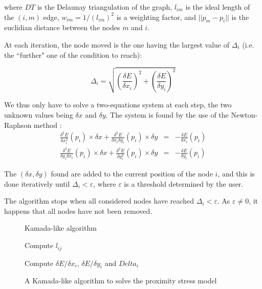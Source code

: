 \documentclass[12pt]{report}
\begin{document}
where $DT$ is the Delaunay triangulation of the graph, $l_{im}$ is the ideal length of the $(i,m)$ edge, $w_{im} = 1/(l_{im})^2 $ is a weighting factor, and $||p_m - p_i||$ is the euclidian distance between the nodes $m$ and $i$.

At each iteration, the node moved is the one having the largest value of $\Delta_i$ (i.e. the ``further" one of the condition to reach):

\[\Delta_i = \sqrt{\left(\frac{\delta E}{\delta x_i}\right)^2 + \left(\frac{\delta E}{\delta y_i}\right)^2} \]

\bigskip
We thus only have to solve a two-equations system at each step, the two unknown values being $\delta x$ and $\delta y$. The system is found by the use of the Newton-Raphson method :
\begin{eqnarray}
\label{eq1}
\frac{\delta^2 E}{\delta x_i^2}(p_i) \times \delta x +  \frac{\delta^2 E}{\delta x_i \delta y_i}(p_i) \times \delta y  & = & - \frac{\delta E}{\delta x_i} (p_i) \\
\frac{\delta^2 E}{\delta y_i \delta x_i}(p_i) \times \delta x +  \frac{\delta^2 E}{\delta y_i^2}(p_i) \times \delta y & = & - \frac{\delta E}{\delta y_i} (p_i)
\label{eq2}
\end{eqnarray}

The $(\delta x, \delta y)$ found are added to the current position of the node $i$, and this is done iteratively until $\Delta_i < \varepsilon$, where $\varepsilon$ is a threshold determined by the user.

The algorithm stops when all considered nodes have reached $\Delta_i < \varepsilon$. As $\varepsilon \neq 0$, it happens that all nodes have not been removed.

\begin{figure}
\begin{algorithm}[H]
\caption{Kamada-like algorithm}
{Compute $l_{ij}$}

{Compute $\delta E / \delta x_i$, $\delta E / \delta y_i$ and $Delta_i$}


\end{algorithm}
\caption{A Kamada-like algorithm to solve the proximity stress model}
\label{algkamada}
\end{figure}
\end{document}
